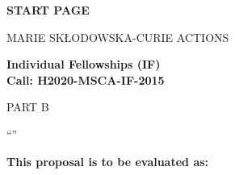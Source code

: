 \phantom{a}
\vspace{15mm}
\begin{center}


        \Large{


        \textbf{START PAGE}

          \vspace{15mm}
          MARIE SK\L{}ODOWSKA-CURIE ACTIONS\\
          \vspace{1cm}

          \textbf{Individual Fellowships (IF)}\\
          \textbf{Call: H2020-MSCA-IF-2015}
          \vspace{2cm}

          PART B
          \vspace{2.5cm}

          ``\proposalAcronym''
          \vspace{2cm}

          \textbf{This proposal is to be evaluated as:}
          \vspace{.5cm}

          \textbf{\evaluationPannel}
        }

  \end{center}
\vspace{1cm}

